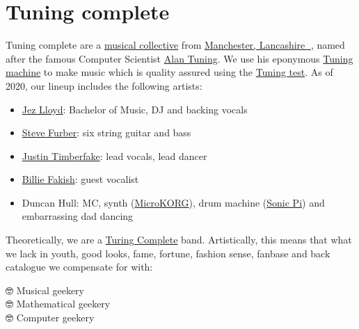 \documentclass[
  12pt,
]{book}
\providecommand{\tightlist}{%
  \setlength{\itemsep}{0pt}\setlength{\parskip}{0pt}}
\begin{document}
\hypertarget{tuningcomplete}{%
\section{Tuning complete}\label{tuningcomplete}}

Tuning complete are a \href{https://en.wikipedia.org/wiki/Musical_collective}{musical collective} from \href{https://duncan.hull.name/2019/07/05/mancashire/}{Manchester, Lancashire 🌹}, named after the famous Computer Scientist \href{https://en.wikipedia.org/wiki/Alan_Turing}{Alan Tuning}. We use his eponymous \href{https://en.wikipedia.org/wiki/Turing_machine}{Tuning machine} to make music which is quality assured using the \href{https://en.wikipedia.org/wiki/Turing_test}{Tuning test}. As of 2020, our lineup includes the following artists:

\begin{itemize}
\tightlist
\item
  \href{https://www.linkedin.com/in/jez-lloyd-84077069}{Jez Lloyd}: Bachelor of Music, DJ and backing vocals
\item
  \href{https://en.wikipedia.org/wiki/Steve_Furber}{Steve Furber}: six string guitar and bass
\item
  \href{https://en.wikipedia.org/wiki/Justin_Timberlake}{Justin Timberfake}: lead vocals, lead dancer
\item
  \href{https://en.wikipedia.org/wiki/Billie_Eilish}{Billie Fakish}: guest vocalist
\item
  Duncan Hull: MC, synth (\href{https://en.wikipedia.org/wiki/MicroKORG}{MicroKORG}), drum machine (\href{https://sonic-pi.net/}{Sonic Pi}) and embarrassing dad dancing \citep{daddancing}
\end{itemize}

Theoretically, we are a \href{https://en.wikipedia.org/wiki/Turing_completeness}{Turing Complete} band. \citep{Turing1937, turingcomplete} Artistically, this means that what we lack in youth, good looks, fame, fortune, fashion sense, fanbase and back catalogue we compensate for with:

🤓 Musical geekery \citep{musicnmaths, behindthemusic}\\
🤓 Mathematical geekery \citep{plusmaths}\\
🤓 Computer geekery \citep{Aaron2016}
\end{document}
